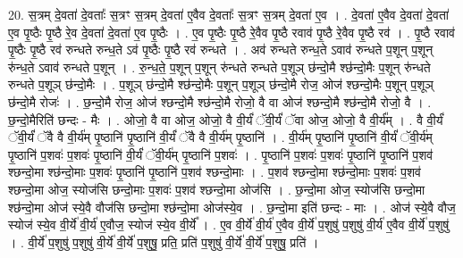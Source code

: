 \documentclass[17pt]{extarticle}
\begin{document}
20. स॒त्रम् दे॒वता॑ दे॒वताः᳚ स॒त्रꣳ स॒त्रम् दे॒वता॑ ए॒वैव दे॒वताः᳚ स॒त्रꣳ स॒त्रम् दे॒वता॑ ए॒व । . दे॒वता॑ ए॒वैव दे॒वता॑ दे॒वता॑ ए॒व पृ॒ष्ठैः पृ॒ष्ठै रे॒व दे॒वता॑ दे॒वता॑ ए॒व पृ॒ष्ठैः । . ए॒व पृ॒ष्ठैः पृ॒ष्ठै रे॒वैव पृ॒ष्ठै रवाव॑ पृ॒ष्ठै रे॒वैव पृ॒ष्ठै रव॑ । . पृ॒ष्ठै रवाव॑ पृ॒ष्ठैः पृ॒ष्ठै रव॑ रुन्धते रुन्ध॒ते ऽव॑ पृ॒ष्ठैः पृ॒ष्ठै रव॑ रुन्धते । . अव॑ रुन्धते रुन्ध॒ते ऽवाव॑ रुन्धते प॒शून् प॒शून् रु॑न्ध॒ते ऽवाव॑ रुन्धते प॒शून् । . रु॒न्ध॒ते॒ प॒शून् प॒शून् रु॑न्धते रुन्धते प॒शूञ् छ॑न्दो॒मै श्छ॑न्दो॒मैः प॒शून् रु॑न्धते रुन्धते प॒शूञ् छ॑न्दो॒मैः । . प॒शूञ् छ॑न्दो॒मै श्छ॑न्दो॒मैः प॒शून् प॒शूञ् छ॑न्दो॒मै रोज॒ ओज॑ श्छन्दो॒मैः प॒शून् प॒शूञ् छ॑न्दो॒मै रोजः॑ । . छ॒न्दो॒मै रोज॒ ओज॑ श्छन्दो॒मै श्छ॑न्दो॒मै रोजो॒ वै वा ओज॑ श्छन्दो॒मै श्छ॑न्दो॒मै रोजो॒ वै । . छ॒न्दो॒मैरिति॑ छन्दः - मैः । . ओजो॒ वै वा ओज॒ ओजो॒ वै वी॒र्यं॑ ॅवी॒र्यं॑ ॅवा ओज॒ ओजो॒ वै वी॒र्य᳚म् । . वै वी॒र्यं॑ ॅवी॒र्यं॑ ॅवै वै वी॒र्य॑म् पृ॒ष्ठानि॑ पृ॒ष्ठानि॑ वी॒र्यं॑ ॅवै वै वी॒र्य॑म् पृ॒ष्ठानि॑ । . वी॒र्य॑म् पृ॒ष्ठानि॑ पृ॒ष्ठानि॑ वी॒र्यं॑ ॅवी॒र्य॑म् पृ॒ष्ठानि॑ प॒शवः॑ प॒शवः॑ पृ॒ष्ठानि॑ वी॒र्यं॑ ॅवी॒र्य॑म् पृ॒ष्ठानि॑ प॒शवः॑ । . पृ॒ष्ठानि॑ प॒शवः॑ प॒शवः॑ पृ॒ष्ठानि॑ पृ॒ष्ठानि॑ प॒शव॑ श्छन्दो॒मा श्छ॑न्दो॒माः प॒शवः॑ पृ॒ष्ठानि॑ पृ॒ष्ठानि॑ प॒शव॑ श्छन्दो॒माः । . प॒शव॑ श्छन्दो॒मा श्छ॑न्दो॒माः प॒शवः॑ प॒शव॑ श्छन्दो॒मा ओज॒ स्योज॑सि छन्दो॒माः प॒शवः॑ प॒शव॑ श्छन्दो॒मा ओज॑सि । . छ॒न्दो॒मा ओज॒ स्योज॑सि छन्दो॒मा श्छ॑न्दो॒मा ओज॑ स्ये॒वै वौज॑सि छन्दो॒मा श्छ॑न्दो॒मा ओज॑स्ये॒व । . छ॒न्दो॒मा इति॑ छन्दः - माः । . ओज॑ स्ये॒वै वौज॒ स्योज॑ स्ये॒व वी॒र्ये॑ वी॒र्य॑ ए॒वौज॒ स्योज॑ स्ये॒व वी॒र्ये᳚ । . ए॒व वी॒र्ये॑ वी॒र्य॑ ए॒वैव वी॒र्ये॑ प॒शुषु॑ प॒शुषु॑ वी॒र्य॑ ए॒वैव वी॒र्ये॑ प॒शुषु॑ । . वी॒र्ये॑ प॒शुषु॑ प॒शुषु॑ वी॒र्ये॑ वी॒र्ये॑ प॒शुषु॒ प्रति॒ प्रति॑ प॒शुषु॑ वी॒र्ये॑ वी॒र्ये॑ प॒शुषु॒ प्रति॑ । \newline
\end{document}
